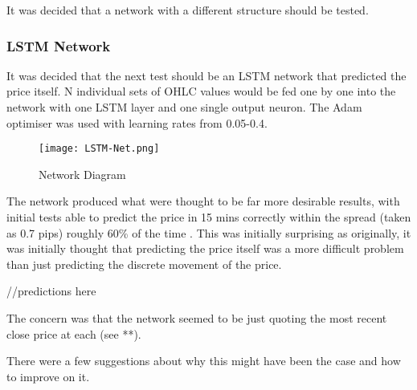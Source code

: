             It was decided that a network with a different structure should be tested.


            \subsubsection{LSTM Network}
            It was decided that the next test should be an LSTM network that predicted the price itself. N individual sets of OHLC values would be fed one by one into the network with one LSTM layer and one single output neuron. The Adam optimiser was used with learning rates from 0.05-0.4.

            \begin{figure}[h]
                \centering
                \texttt{[image: LSTM-Net.png]}
                \caption{Network Diagram}
                \label{fig:LSTM_Diagram}
            \end{figure}

            The network produced what were thought to be far more desirable results, with initial tests able to predict the price in 15 mins correctly within the spread (taken as 0.7 pips) roughly 60\% of the time . This was initially surprising as originally, it was initially thought that predicting the price itself was a more difficult problem than just predicting the discrete movement of the price.

            //predictions here

            The concern was that the network seemed to be just quoting the most recent close price at each (see **).


            There were a few suggestions about why this might have been the case and how to improve on it.

